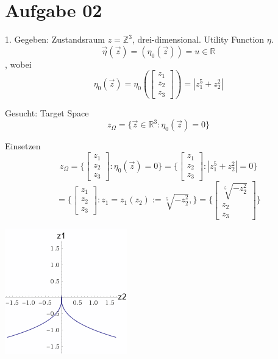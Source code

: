 \documentclass{ocbeameruni}
\begin{document}
\section{Aufgabe 02}

\begin{frame}{2.1}
1. Gegeben: Zustandsraum $z=\mathbb{Z}^3$, drei-dimensional. Utility Function $\eta$.
\begin{equation}
	\vec{\eta}(\vec{z}) = (\eta_0(\vec{z})) = u \in \mathbb{R}
\end{equation}
	, wobei
\begin{equation}
\eta_0(\vec{z}) = \eta_0(\begin{bmatrix}z_{1} \\z_{2} \\z_3\end{bmatrix}) = | z_1^5 + z_2^2 |
\end{equation}

Gesucht: Target Space
\begin{equation}
z_\Omega = \{\vec{z} \in \mathbb{R}^3 : \eta_0(\vec{z}) = 0 \}
\end{equation}
\end{frame}
\begin{frame}{2.1}
Einsetzen
\begin{equation}
z_\Omega = \{ \begin{bmatrix}z_{1} \\z_{2} \\z_3\end{bmatrix} : \eta_0(\vec{z}) = 0 \}
= \{ \begin{bmatrix}z_{1} \\z_{2} \\z_3\end{bmatrix} :| z_1^5 + z_2^2 | = 0 \}
\end{equation}
\begin{equation}
= \{ \begin{bmatrix}z_{1} \\z_{2} \\z_3\end{bmatrix} : z_1 = z_1(z_2) := \sqrt[5]{-z_2^2}, \}
= \{ \begin{bmatrix} \sqrt[5]{-z_2^2} \\z_{2} \\z_3\end{bmatrix}\}
\end{equation}

\includegraphics[scale=0.5]{z1.png}
\end{frame}
\end{document}
